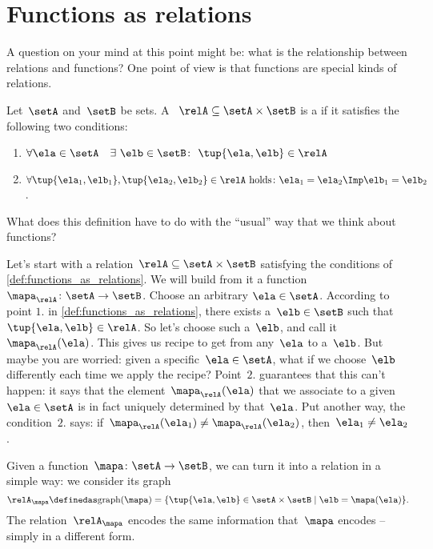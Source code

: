 

\section{Functions as relations}

A question on your mind at this point might be: what is the relationship between relations and functions? One point of view is that functions are special kinds of relations.

\begin{definition}
  \label{def:functions_as_relations}
  Let~$\setA$ and~$\setB$ be sets. A ~$\relA \subseteq \setA \times \setB$ is a \emph{} if it satisfies the following two conditions:
  \begin{enumerate}
    \item $\forall \ela \in \setA \quad \exists \ \elb \in \setB\colon  \ \tup{\ela,\elb} \in \relA$
    \item $\forall \tup{\ela_1, \elb_1}, \tup{\ela_2, \elb_2} \in \relA  \text{ holds}\colon \ela_1 = \ela_2 \Imp \elb_1 = \elb_2$.
  \end{enumerate}
\end{definition}

What does this definition have to do with the ``usual'' way that we think about functions?

Let's start with a relation~$\relA \subseteq \setA \times \setB$ satisfying the conditions of \cref{def:functions_as_relations}. We will build from it a function~$\mapa_\relA \colon \setA \to \setB$. Choose an arbitrary $\ela \in \setA$. According to point $1.$ in \cref{def:functions_as_relations}, there exists a~$\elb \in \setB$ such that~$\tup{\ela,\elb} \in \relA$. So let's choose such a~$\elb$, and call it~$\mapa_\relA(\ela)$. This gives us recipe to get from any~$\ela$ to a~$\elb$. But maybe you are worried: given a specific~$\ela \in \setA$, what if we choose~$\elb$ differently each time we apply the recipe? Point~$2.$ guarantees that this can't happen: it says that the element~$\mapa_\relA(\ela)$ that we associate to a given~$\ela \in \setA$ is in fact uniquely determined by that~$\ela$. Put another way, the condition~$2.$ says: if~$\mapa_\relA(\ela_1) \neq \mapa_\relA(\ela_2)$, then~$\ela_1 \neq\ela_2$.

Given a function~$\mapa \colon \setA \to \setB$, we can turn it into a relation in a simple way: we consider its graph
\begin{equation*}
  \relA_\mapa \definedas \text{graph}(\mapa) = \{ \tup{\ela,\elb} \in \setA \times \setB \mid \elb= \mapa(\ela) \}.
\end{equation*}
The relation~$\relA_\mapa$ encodes the same information that~$\mapa$ encodes -- simply in a different form.

